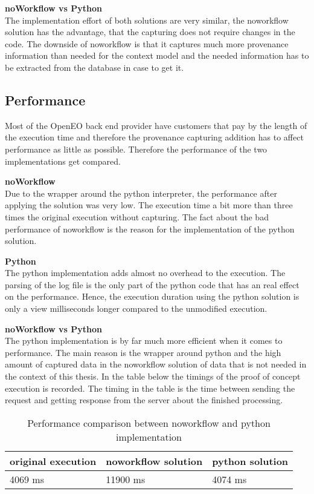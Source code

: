 \documentclass[draft,final]{vutinfth} %
\begin{document}
\textbf{noWorkflow vs Python} \\
The implementation effort of both solutions are very similar, the noworkflow solution has the advantage, that the capturing does not require changes in the code. The downside of noworkflow is that it captures much more provenance information than needed for the context model and the needed information has to be extracted from the database in case to get it. 

\subsection{Performance}\label{NvsP:Performance}
Most of the OpenEO back end provider have customers that pay by the length of the execution time and therefore the provenance capturing addition has to affect performance as little as possible. Therefore the performance of the two implementations get compared.

\textbf{noWorkflow} \\
Due to the wrapper around the python interpreter, the performance after applying the solution was very low. The execution time a bit more than three times the original execution without capturing. The fact about the bad performance of noworkflow is the reason for the implementation of the python solution. 

\textbf{Python} \\
The python implementation adds almost no overhead to the execution. The parsing of the log file is the only part of the python code that has an real effect on the performance. Hence, the execution duration using the python solution is only a view milliseconds longer compared to the unmodified execution.  

\textbf{noWorkflow vs Python} \\
The python implementation is by far much more efficient when it comes to performance. The main reason is the wrapper around python and the high amount of captured data in the noworkflow solution of data that is not needed in the context of this thesis. In the table below the timings of the proof of concept execution is recorded. The timing in the table is the time between sending the request and getting response from the server about the finished processing. 

\begin{table}[]
	\caption{Performance comparison between noworkflow and python implementation}
	\centering
	\begin{tabular}{l|l|l}
		\textbf{original execution} & \textbf{noworkflow solution} & \textbf{python solution} \\ \hline
		4069 ms & 11900 ms & 4074 ms \\ 
	\end{tabular}
	\label{Tab:noworkflow}
\end{table}
\end{document}

